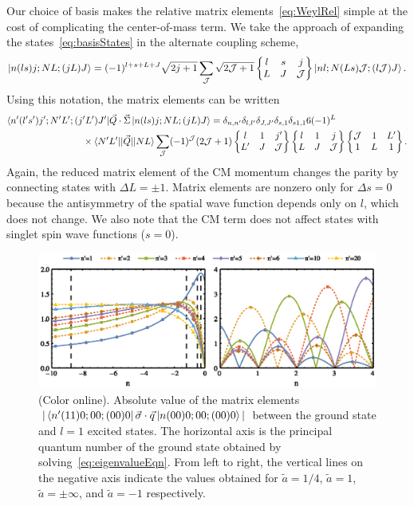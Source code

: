 \documentclass[%
 notitlepage,
 preprint,
showpacs,%
 amsmath,amssymb,
 aps,
pra,
]{revtex4-1}
\newcommand{\sixj}[6]{ \begin{Bmatrix}
  #1 & #2 & #3 \\
  #4 & #5 & #6 
 \end{Bmatrix}}
\begin{document}
Our choice of basis makes the relative matrix elements~\eqref{eq:WeylRel} simple at the cost of complicating the center-of-mass term. We take the approach of expanding the states~\eqref{eq:basisStates} in the alternate coupling scheme,
\begin{equation}\label{eq:basisStates2}
\ket{n(ls)j;NL;(jL)J}=(-1)^{l+s+L+J}\sqrt{2j+1}\sum_{\mathcal{J}}\sqrt{2\mathcal{J}+1}\sixj{l}{s}{j}{L}{J}{\mathcal{J}}\ket{nl;N(Ls)\mathcal{J};(l\mathcal{J})J}.
\end{equation}
Using this notation, the matrix elements can be written
\begin{equation}\begin{split}
\bra{n'(l's')j';N'L';(j'L')J'}&\vec{Q}\cdot\vec{\Sigma} \ket{n(ls)j;NL;(jL)J} = \delta_{n,n'}\delta_{l,l'}\delta_{J,J'}\delta_{s,1}\delta_{s1,1}   6 (-1)^{L} \\
&\hspace{-1cm}\times\braket{N'L'|| \vec{Q} || NL} \sum_{\mathcal{J}}(-1)^\mathcal{J} (2\mathcal{J}+1)\sixj{l}{1}{j'}{L'}{J}{\mathcal{J}}\sixj{l}{1}{j}{L}{J}{\mathcal{J}}\sixj{\mathcal{J}}{1}{L'}{1}{L}{1}.
\end{split}
\end{equation}
Again, the reduced matrix element of the CM momentum changes the parity by connecting states with $\Delta L=\pm1$. Matrix elements are nonzero only for $\Delta s=0$ because the antisymmetry of the spatial wave function depends only on $l$, which does not change. We also note that the CM term does not affect states with singlet spin wave functions ($s=0$).


\begin{figure}
\includegraphics{Figures/MatrixElts}
\caption{\label{fig:matrixElts}(Color online).  Absolute value of the matrix elements $|\bra{n'(11)0;00;(00)0}\vec{\sigma}\cdot\vec{q}\ket{n(00)0;00;(00)0}|$ between the ground state and $l=1$ excited states. The horizontal axis is the principal quantum number of the ground state obtained by solving~\eqref{eq:eigenvalueEqn}. From left to right, the vertical lines on the negative axis indicate the values obtained for $\tilde{a}=1/4$, $\tilde{a}=1$, $\tilde{a}=\pm\infty$, and $\tilde{a}=-1$ respectively.} 
\end{figure}
\end{document}
